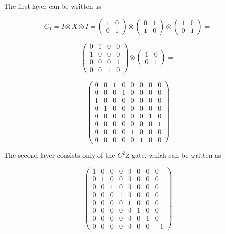 The first layer can be written as

\[ C_1 = I \otimes X \otimes I = \begin{pmatrix} 1 & 0 \\ 0 & 1 \end{pmatrix} \otimes \begin{pmatrix} 0 & 1 \\ 1 & 0 \end{pmatrix} \otimes \begin{pmatrix} 1 & 0 \\ 0 & 1 \end{pmatrix} = \]

\[ \begin{pmatrix} 0 & 1 & 0 & 0 \\ 1 & 0 & 0 & 0 \\ 0 & 0 & 0 & 1 \\ 0 & 0 & 1 & 0 \end{pmatrix} \otimes \begin{pmatrix} 1 & 0 \\ 0 & 1 \end{pmatrix} = \]

\[ \begin{pmatrix}
0 & 0 & 1 & 0 & 0 & 0 & 0 & 0 \\
0 & 0 & 0 & 1 & 0 & 0 & 0 & 0 \\
1 & 0 & 0 & 0 & 0 & 0 & 0 & 0 \\
0 & 1 & 0 & 0 & 0 & 0 & 0 & 0 \\
0 & 0 & 0 & 0 & 0 & 0 & 1 & 0 \\
0 & 0 & 0 & 0 & 0 & 0 & 0 & 1 \\
0 & 0 & 0 & 0 & 1 & 0 & 0 & 0 \\
0 & 0 & 0 & 0 & 0 & 1 & 0 & 0
\end{pmatrix}\]

The second layer consists only of the $C^2Z$ gate, which can be written as

\[ \begin{pmatrix}
1 & 0 & 0 & 0 & 0 & 0 & 0 & 0 \\
0 & 1 & 0 & 0 & 0 & 0 & 0 & 0 \\
0 & 0 & 1 & 0 & 0 & 0 & 0 & 0 \\
0 & 0 & 0 & 1 & 0 & 0 & 0 & 0 \\
0 & 0 & 0 & 0 & 1 & 0 & 0 & 0 \\
0 & 0 & 0 & 0 & 0 & 1 & 0 & 0 \\
0 & 0 & 0 & 0 & 0 & 0 & 1 & 0 \\
0 & 0 & 0 & 0 & 0 & 0 & 0 & -1
\end{pmatrix} \]

